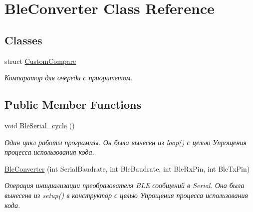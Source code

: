 \hypertarget{classBleConverter}{}\section{Ble\+Converter Class Reference}
\label{classBleConverter}
\subsection*{Classes}
\begin{DoxyCompactItemize}
\item 
struct \hyperlink{structBleConverter_1_1CustomCompare}{Custom\+Compare}
\begin{DoxyCompactList}\small\item\em Компаратор для очереди с приоритетом. \end{DoxyCompactList}\end{DoxyCompactItemize}
\subsection*{Public Member Functions}
\begin{DoxyCompactItemize}
\item 
\mbox{\label{classBleConverter_ab0ee446cd405424a643832588b71c765}} 
void \hyperlink{classBleConverter_ab0ee446cd405424a643832588b71c765}{Ble\+Serial\+\_\+cycle} ()
\begin{DoxyCompactList}\small\item\em Один цикл работы программы.  Он была вынесен из loop() с целью Упрощения процесса использования кода. \end{DoxyCompactList}\item 
\hyperlink{classBleConverter_a15863f36b3c75a32e5d1861b60b3aecc}{Ble\+Converter} (int Serial\+Baudrate, int Ble\+Baudrate, int Ble\+Rx\+Pin, int Ble\+Tx\+Pin)
\begin{DoxyCompactList}\small\item\em Операция инициализации преобразователя B\+LE сообщений в Serial.  Она была вынесенв из setup() в конструктор с целью Упрощения процесса использования кода. \end{DoxyCompactList}\end{DoxyCompactItemize}
